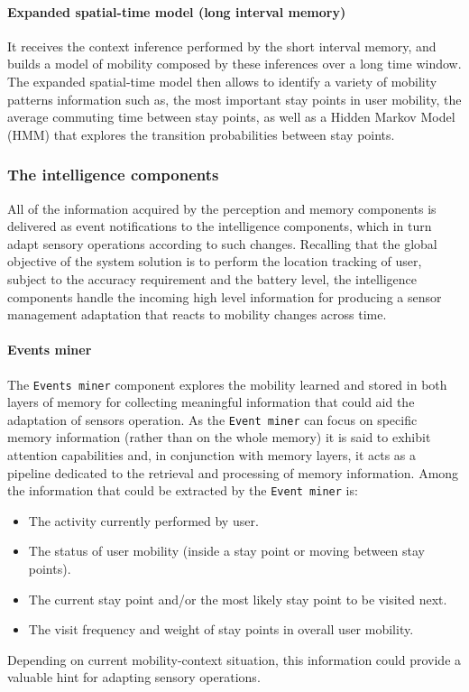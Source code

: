 \documentclass[ENG,PhD]{cinvestav}
\begin{document}
\paragraph*{Expanded spatial-time model (long interval memory)}
It receives the context inference performed by the short interval memory, and builds a model of mobility composed by these inferences over a long time window.
The expanded spatial-time model then allows to identify a variety of mobility patterns information such as, the most important stay points in user mobility, the average commuting time between stay points, as well as a Hidden Markov Model (HMM) that explores the transition probabilities between stay points.

\subsubsection{The intelligence components}
All of the information acquired by the perception and memory components is delivered as event notifications to the intelligence components, which in turn adapt sensory operations according to such changes.
Recalling that the global objective of the system solution is to perform the location tracking of user, subject to the accuracy requirement and the battery level, the intelligence components handle the incoming high level information for producing a sensor management adaptation that reacts to mobility changes across time.

\paragraph*{Events miner}
The \texttt{Events miner} component explores the mobility learned and stored in both layers of memory for collecting meaningful information that could aid the adaptation of sensors operation.
As the \texttt{Event miner} can focus on specific memory information (rather than on the whole memory) it is said to exhibit attention capabilities and, in conjunction with memory layers, it acts as a pipeline dedicated to the retrieval and processing of memory information.
Among the information that could be extracted by the \texttt{Event miner} is:
\begin{itemize}
  \item The activity currently performed by user.
  \item The status of user mobility (inside a stay point or moving between stay points).
  \item The current stay point and/or the most likely stay point to be visited next.
  \item The visit frequency and weight of stay points in overall user mobility.
\end{itemize}
Depending on current mobility-context situation, this information could provide a valuable hint for adapting sensory operations.
\end{document}
